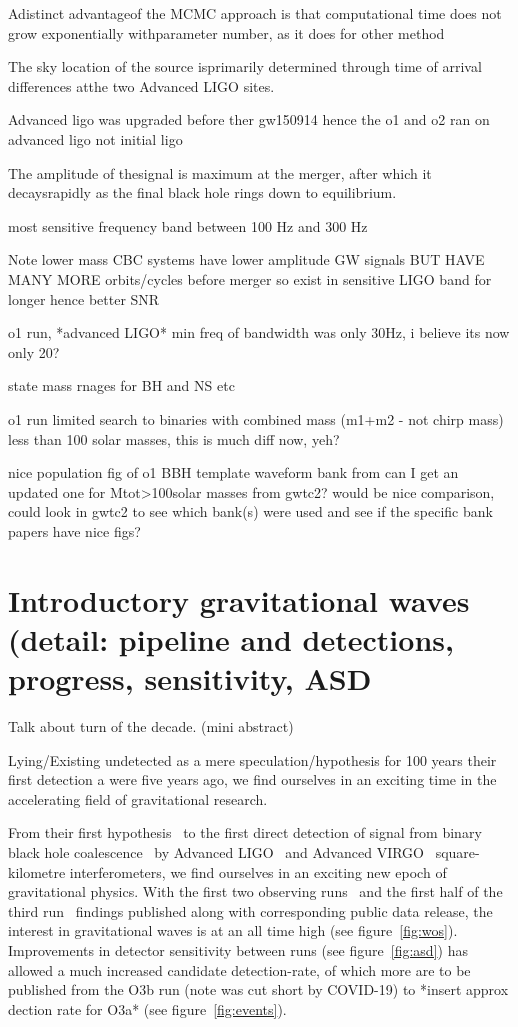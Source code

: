 \documentclass[11pt]{article}
\begin{document}
Adistinct advantageof the MCMC approach is that computational time does not grow exponentially withparameter number, as it does for other method

The sky location of the source isprimarily determined through time of arrival differences atthe two Advanced LIGO sites. 

Advanced ligo was upgraded before ther gw150914 hence the o1 and o2 ran on advanced ligo not initial ligo


The amplitude of thesignal is maximum at the merger, after which it decaysrapidly as the final black hole rings down to equilibrium.

most sensitive frequency band between 100 Hz and 300 Hz


Note lower mass CBC systems have lower amplitude GW signals BUT HAVE MANY MORE orbits/cycles before merger so exist in sensitive LIGO band for longer hence better SNR

o1 run, *advanced LIGO* min freq of bandwidth was only 30Hz, i believe its now only 20?

state mass rnages for BH and NS etc

o1 run limited search to binaries with combined mass (m1+m2 - not chirp mass) less than 100 solar masses, this is much diff now, yeh?

nice population fig of o1 BBH template waveform bank from \cite{BBHo1} can I get an updated one for Mtot>100solar masses from gwtc2? would be nice comparison, could look in gwtc2 to see which bank(s) were used and see if the specific bank papers have nice figs? 

\section{Introductory gravitational waves (detail: pipeline and detections, progress, sensitivity, ASD}

Talk about turn of the decade. (mini abstract)

Lying/Existing undetected as a mere speculation/hypothesis for 100 years their first detection a were five years ago, we find ourselves in an exciting time in the accelerating field of gravitational research. 


From their first hypothesis~\cite{einstein1} to the first direct detection of signal from binary black hole coalescence~\cite{abbott2016observation} by Advanced LIGO~\cite{advancedLIGO} and Advanced VIRGO~\cite{advacnedVIRGO} square-kilometre interferometers, we find ourselves in an exciting new epoch of gravitational physics. With the first two observing runs~\cite{BBHO1,gwtc1} and the first half of the third run~\cite{gwtc2} findings published along with corresponding public data release, the interest in gravitational waves is at an all time high (see figure~\ref{fig:wos}). Improvements in detector sensitivity between runs (see figure~\ref{fig:asd}) has allowed a much increased candidate detection-rate, of which more are to be published from the O3b run (note was cut short by COVID-19) to *insert approx dection rate for O3a* (see figure~\ref{fig:events}).
\end{document}

